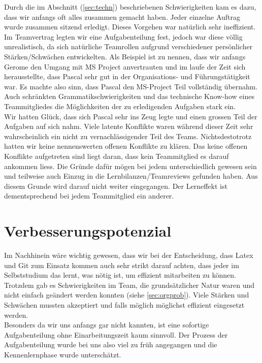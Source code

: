 Durch die im Abschnitt (\ref{sec:techn}) beschriebenen Schwierigkeiten kam es dazu, dass wir anfangs oft alles zusammen gemacht haben. Jeder einzelne Auftrag wurde zusammen sitzend erledigt. Dieses Vorgehen war natürlich sehr ineffizient. Im Teamvertrag legten wir eine Aufgabenteilung fest, jedoch war diese völlig unrealistisch, da sich natürliche Teamrollen aufgrund verschiedener persönlicher Stärken/Schwächen entwickelten. Als Beispiel ist zu nennen, dass wir anfangs Gerome den Umgang mit MS Project anvertrauten und im laufe der Zeit sich herausstellte, dass Pascal sehr gut in der Organisations- und Führungstätigkeit war. Es machte also sinn, dass Pascal den MS-Project Teil vollständig übernahm. Auch schränkten Grammatikschwierigkeiten und das technische Know-how eines Teammitgliedes die Möglichkeiten der zu erledigenden Aufgaben stark ein. \\
Wir hatten Glück, dass sich Pascal sehr ins Zeug legte und einen grossen Teil der Aufgaben auf sich nahm. Viele latente Konflikte waren während dieser Zeit sehr wahrscheinlich ein nicht zu vernachlässigender Teil des Teams. Nichtsdestotrotz hatten wir keine nennenswerten offenen Konflikte zu klären. Das keine offenen Konflikte aufgetreten sind liegt daran, dass kein Teammitglied es darauf ankommen liess. Die Gründe dafür mögen bei jedem unterschiedlich gewesen sein und teilweise auch Einzug in die Lernbilanzen/Teamreviews gefunden haben. Aus diesem Grunde wird darauf nicht weiter eingegangen. Der Lerneffekt ist dementsprechend bei jedem Teammitglied ein anderer.


\section{Verbesserungspotenzial}

Im Nachhinein wäre wichtig gewesen, dass wir bei der Entscheidung, dass Latex und Git zum Einsatz kommen auch sehr strikt darauf achten, dass jeder im Selbststudium das lernt, was nötig ist, um effizient mitarbeiten zu können. \\
Trotzdem gab es Schwierigkeiten im Team, die grundsätzlicher Natur waren und nicht einfach geändert werden konnten (siehe \ref{sec:orgprob}). Viele Stärken und Schwächen mussten akzeptiert und falls möglich möglichst effizient eingesetzt werden. \\
Besonders da wir uns anfangs gar nicht kannten, ist eine sofortige Aufgabenteilung ohne Einarbeitungszeit kaum sinnvoll. Der Prozess der Aufgabenteilung wurde bei uns also viel zu früh angegangen und die Kennenlernphase wurde unterschätzt. 